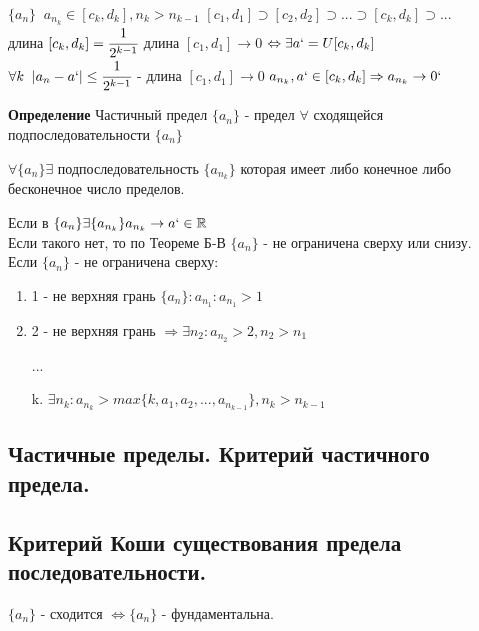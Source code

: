 \documentclass[12pt, a4paper]{article}
\newcommand{\R}{\mathbb{R}}
\begin{document}
\begin{centering}
\begin{tcolorbox}[title=Доказательство]
\begin{enumerate}
        $\{a_n\} \;\;a_{n_k} \in [c_k,d_k], n_k > n_{k-1}$
        $[c_1,d_1] \supset [c_2,d_2] \supset ... \supset [c_k,d_k] \supset ...$\\
        длина $[c_k,d_k] = \cfrac{1}{2^{k-1}}$
        длина $[c_1,d_1] \to 0$
        $\Leftrightarrow \exists a` = U[c_k,d_k]$\\
        $\forall k\;\; |a_n-a`| \leq \cfrac{1}{2^{k-1}}$ - длина $[c_1,d_1] \to 0$
        $a_{n_k}, a`\in [c_k,d_k] \Rightarrow a_{n_k} \to 0`$
    \end{enumerate}
\end{tcolorbox}

\begin{tcolorbox}
    \textbf{Определение} Частичный предел $\{a_n\}$ - предел $\forall$ сходящейся подпоследовательности $\{a_n\}$
\end{tcolorbox}
\begin{tcolorbox}[title=Следствие из теоремы]
    $\forall \{a_n\} \exists$ подпоследовательность $\{a_{n_k}\}$ которая имеет либо конечное либо бесконечное число пределов.
\end{tcolorbox}
\begin{tcolorbox}[title=Доказательство]
    Если в $\{a_n\} \exists \{a_{n_k}\} a_{n_k} \to a` \in \R$\\
    Если такого нет, то по Теореме Б-В $\{a_{n}\}$ - не ограничена сверху или снизу.\\

    Если $\{a_{n}\} $ - не ограничена сверху:
    \begin{enumerate}
        \item 1 - не верхняя грань $\{a_{n}\}: a_{n_1}: a_{n_1} > 1$
        \item 2 - не верхняя грань $\Rightarrow \exists n_2: a_{n_2}>2, n_2>n_1$
        \item[...]
        \item [k.] $\exists n_k: a_{n_k}>max\{k, a_1, a_2, ..., a_{n_{k-1}}\}, n_k>n_{k-1}$
    \end{enumerate}
\end{tcolorbox}

\subsection{Частичные пределы. Критерий частичного предела.}
\subsection{Критерий Коши существования предела последовательности.}
\begin{tcolorbox}
    $\{a_n\}$ - сходится $\Leftrightarrow \{a_n\}$ - фундаментальна.
\end{tcolorbox}


\end{centering}
\end{document}
